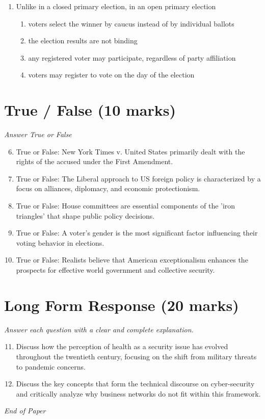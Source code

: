 \documentclass[12pt]{article}
\begin{document}
\begin{enumerate}[label=\arabic*.]
\begin{enumerate}[label=(\alph*)]
    \item vice president
    \item president's chief of staff
    \item national security advisor
    \item chair of the Federal Reserve Board
\end{enumerate}
\item Unlike in a closed primary election, in an open primary election
\begin{enumerate}[label=(\alph*)]
    \item voters select the winner by caucus instead of by individual ballots
    \item the election results are not binding
    \item any registered voter may participate, regardless of party affiliation
    \item voters may register to vote on the day of the election
\end{enumerate}
\end{enumerate}

\section*{True / False (10 marks)}
\textit{Answer True or False}
\begin{enumerate}[label=\arabic*.]
\setcounter{enumi}{5}
\item True or False: New York Times v. United States primarily dealt with the rights of the accused under the First Amendment.
\item True or False: The Liberal approach to US foreign policy is characterized by a focus on alliances, diplomacy, and economic protectionism.
\item True or False: House committees are essential components of the 'iron triangles' that shape public policy decisions.
\item True or False: A voter's gender is the most significant factor influencing their voting behavior in elections.
\item True or False: Realists believe that American exceptionalism enhances the prospects for effective world government and collective security.
\end{enumerate}

\section*{Long Form Response (20 marks)}
\textit{Answer each question with a clear and complete explanation.}
\begin{enumerate}[label=\arabic*.]
\setcounter{enumi}{10}
\item Discuss how the perception of health as a security issue has evolved throughout the twentieth century, focusing on the shift from military threats to pandemic concerns.
\item Discuss the key concepts that form the technical discourse on cyber-security and critically analyze why business networks do not fit within this framework.
\end{enumerate}

\vfill
\noindent\textit{End of Paper}
\end{document}
